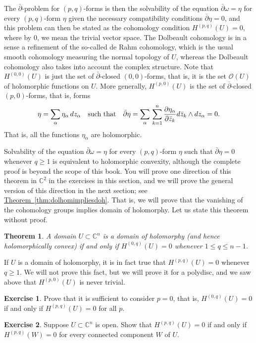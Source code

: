 \documentclass[12pt,openany]{book}
\newcommand{\avoidbreak}{\postdisplaypenalty=100}
\newcommand{\C}{{\mathbb{C}}}
\newcommand{\sO}{{\mathscr{O}}}
\theoremstyle{plain}
\newtheorem{thm}{Theorem}[section]
\theoremstyle{remark}
\theoremstyle{definition}
\newenvironment{exbox}{%
    \def\FrameCommand{\vrule width 1pt \relax\hspace{10pt}}%
    \MakeFramed{\advance\hsize-\width\FrameRestore}%
}{%
    \endMakeFramed
}
\theoremstyle{exercise}
\newtheorem{exercise}{Exercise}[section]
\theoremstyle{example}
\newcommand{\thmref}[1]{\hyperref[#1]{Theorem~\ref*{#1}}}
\begin{document}
The $\bar{\partial}$-problem for $(p,q)$-forms is then the solvability
of the equation $\bar{\partial} \omega = \eta$ for every $(p,q)$-form
$\eta$ given the necessary
compatibility conditions $\bar{\partial} \eta = 0$, and this problem
can then be stated as the cohomology condition $H^{(p,q)}(U) = 0$,
where by $0$, we mean the trivial vector space.
The Dolbeault cohomology is in a sense a refinement
of the so-called de Rahm cohomology,
which is the usual smooth cohomology measuring the normal topology of $U$,
whereas the Dolbeault cohomology also takes into account the complex structure.
Note that $H^{(0,0)}(U)$ is just the set of $\bar{\partial}$-closed
$(0,0)$-forms, that is, it is the set $\sO(U)$ of holomorphic functions on $U$.
More generally, $H^{(p,0)}(U)$ is the set of $\bar{\partial}$-closed
$(p,0)$-forms, that is, forms
\begin{equation*}
\eta =
\sum_{\alpha}
\eta_{\alpha} \, dz_\alpha
\quad \text{such that}
\quad
\bar{\partial} \eta
=
\sum_{\alpha}
\,
\sum_{k=1}^n
\frac{\partial \eta_{\alpha}}{\partial \bar{z}_k} d\bar{z}_k \wedge
dz_\alpha = 0.
\avoidbreak
\end{equation*}
That is, all the functions $\eta_{\alpha}$ are holomorphic.

Solvability of the equation $\bar{\partial} \omega = \eta$ for every $(p,q)$-form
$\eta$ such that $\bar{\partial} \eta = 0$ whenever $q \geq 1$
is equivalent to holomorphic convexity, although
the complete proof is beyond the scope of this book.  You will prove
one direction of this theorem in $\C^2$ in the exercises in this section,
and we will prove the general version of this direction in the next section;
see \thmref{thm:dolhomimpliesdoh}.  That is, we will prove that
the vanishing of the cohomology groups implies domain of holomorphy.
Let us state this theorem without proof.

\begin{thm}
A domain $U \subset \C^n$ is a domain of holomorphy
(and hence holomorphically convex) if and only if $H^{(0,q)}(U) = 0$
whenever $1 \leq q \leq n-1$.
\end{thm}

If $U$ is a domain of holomorphy, it is in fact true that $H^{(p,q)}(U) = 0$
whenever $q \geq 1$.  We will not prove this fact, but we will prove it for a
polydisc, and we saw above that $H^{(p,0)}(U)$ is never trivial.

\begin{exbox}
\begin{exercise} \label{exercise:zeropsufficient}
Prove that
it is sufficient to consider $p=0$,
that is,
$H^{(0,q)}(U) = 0$ if and only if $H^{(p,q)}(U) = 0$ for all $p$.
\end{exercise}

\begin{exercise} \label{exercise:dobeaultdisconnected}
Suppose $U \subset \C^n$ is open.
Show that
$H^{(p,q)}(U) = 0$ if and only if $H^{(p,q)}(W) = 0$ for
every connected component $W$ of $U$.
\end{exercise}
\end{exbox}
\end{document}
